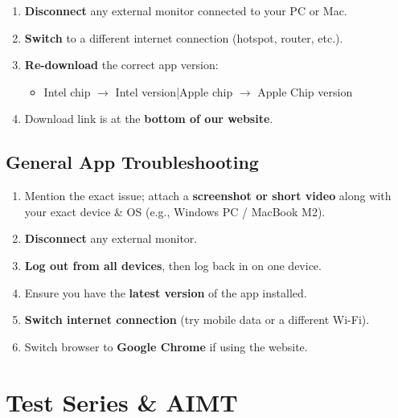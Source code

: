 \begin{alertbox}
  \small
  \begin{enumerate}
    \item \textbf{Disconnect} any external monitor connected to your PC or Mac.
    \item \textbf{Switch} to a different internet connection (hotspot, router, etc.).
    \item \textbf{Re-download} the correct app version:
      \begin{itemize}
        \item Intel chip $\to$ Intel version\quad|\quad Apple chip $\to$ Apple Chip version
      \end{itemize}
    \item Download link is at the \textbf{bottom of our website}.
  \end{enumerate}
\end{alertbox}

\subsection{\faBug\enspace General App Troubleshooting}

\begin{stepbox}
  \small
  \begin{enumerate}
    \item Mention the exact issue; attach a \textbf{screenshot or short video}
          along with your exact device \& OS (e.g., Windows PC / MacBook M2).
    \item \textbf{Disconnect} any external monitor.
    \item \textbf{Log out from all devices}, then log back in on one device.
    \item Ensure you have the \textbf{latest version} of the app installed.
    \item \textbf{Switch internet connection} (try mobile data or a different Wi-Fi).
    \item Switch browser to \textbf{Google Chrome} if using the website.
  \end{enumerate}
\end{stepbox}

\section{Test Series \& AIMT}

